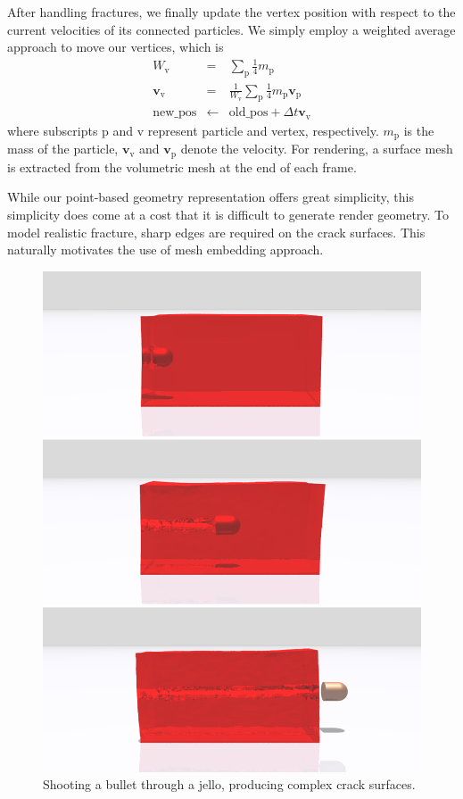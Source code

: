 After handling fractures, we finally update the vertex position with respect to the current velocities of its connected particles.
We simply employ a weighted average approach to move our vertices, which is
\begin{eqnarray}
W_{\mathrm{v}} &=& \sum_{\mathrm{p}} \frac{1}{4}m_{\mathrm{p}}\\
\textbf{v}_{\mathrm{v}} &=& \frac{1}{W_{\mathrm{v}}}\sum_{\mathrm{p}}\frac{1}{4}m_{\mathrm{p}}\textbf{v}_{\mathrm{p}}\\
\mathrm{new\_pos} &\leftarrow& \mathrm{old\_pos} + \Delta t\textbf{v}_{\mathrm{v}}
\end{eqnarray}
where subscripts $\mathrm{p}$ and $\mathrm{v}$ represent particle and vertex, respectively.
$m_{\mathrm{p}}$ is the mass of the particle, $\textbf{v}_{\mathrm{v}}$ and $\textbf{v}_{\mathrm{p}}$ denote the velocity.
For rendering, a surface mesh is extracted from the volumetric mesh at the end of each frame.

While our point-based geometry representation offers great simplicity, this simplicity does come at a cost that it is difficult to generate render geometry. To model realistic fracture, sharp edges are required on the crack surfaces. This naturally motivates the use of mesh embedding approach.

\begin{figure}[t]
  \centering
  \includegraphics[width=\linewidth]{./figs/demo_jello.png}
  \caption{\label{fig:6}
  Shooting a bullet through a jello, producing complex crack surfaces.
}
\end{figure}

